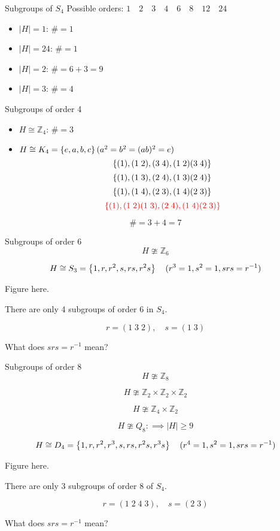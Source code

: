 \begin{frame}{Subgroups of $S_4$}
  Possible orders: $1 \quad 2 \quad 3 \quad 4 \quad 6 \quad 8 \quad 12 \quad 24$

  \begin{itemize}
    \item $|H| = 1$: $\# = 1$
    \item $|H| = 24$: $\# = 1$
    \item $|H| = 2$: $\# = 6 + 3 = 9$
    \item $|H| = 3$: $\# = 4$
  \end{itemize}
\end{frame}
\begin{frame}{Subgroups of order 4}
  \begin{itemize}
    \item $H \cong \mathbb{Z}_{4}$: $\# = 3$
    \item $H \cong K_{4} = \left\{e, a, b, c\right\} (a^2 = b^2 = (ab)^2 = e)$
      \[ \left\{(1), (1\; 2), (3\; 4), (1\; 2) (3\; 4)\right\} \]
      \[ \left\{(1), (1\; 3), (2\; 4), (1\; 3) (2\; 4)\right\} \]
      \[ \left\{(1), (1\; 4), (2\; 3), (1\; 4) (2\; 3)\right\} \]
      \[ \textcolor{red}{\left\{(1), (1\; 2) (1\; 3), (2\; 4), (1\; 4) (2\; 3)\right\}} \]
  \end{itemize}

  \[
    \# = 3 + 4 = 7
  \]
\end{frame}
\begin{frame}{Subgroups of order 6}
  \[
    H \ncong \mathbb{Z}_{6}
  \]

  \[
    H \cong S_3 = \left\{1, r, r^2, s, rs, r^2s\right\} \quad (r^3 = 1, s^2 = 1, srs = r^{-1})
  \]

  \centerline{Figure here.}

  \begin{theorem}
    There are only 4 subgroups of order 6 in $S_4$.
  \end{theorem}

  \[
    r = (1\;3\;2), \quad s = (1\;3)
  \]

  \centerline{What does $srs = r^{-1}$ mean?}
\end{frame}
\begin{frame}{Subgroups of order 8}
  \[
    H \ncong \mathbb{Z}_{8}
  \]

  \[
    H \ncong \mathbb{Z}_{2} \times \mathbb{Z}_{2} \times \mathbb{Z}_{2}
  \]

  \[
    H \ncong \mathbb{Z}_{4} \times \mathbb{Z}_{2}
  \]

  \[
    H \ncong Q_8: \implies |H| \ge 9
  \]

  \[
    H \cong D_4 = \left\{1, r, r^2, r^3, s, rs, r^2s, r^3s\right\} \quad (r^4 = 1, s^2 = 1, srs = r^{-1})
  \]

  \centerline{Figure here.}

  \begin{theorem}
    There are only 3 subgroups of order 8 of $S_4$.
  \end{theorem}

  \[
    r = (1\;2\;4\;3), \quad s = (2\;3)
  \]

  \centerline{What does $srs = r^{-1}$ mean?}
\end{frame}
